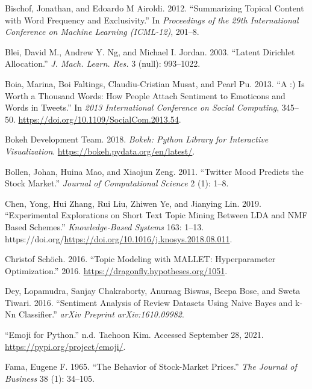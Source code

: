 \documentclass[
]{article}
\newlength{\cslhangindent}
\newlength{\cslentryspacingunit} %
\newenvironment{CSLReferences}[2] %
 {%
  \setlength{\parindent}{0pt}
  \ifodd #1
  \let\oldpar\par
  \def\par{\hangindent=\cslhangindent\oldpar}
  \fi
  \setlength{\parskip}{#2\cslentryspacingunit}
 }%
 {}
\begin{document}
\begin{CSLReferences}{1}{0}
\leavevmode{}%
Bischof, Jonathan, and Edoardo M Airoldi. 2012. {``Summarizing Topical
Content with Word Frequency and Exclusivity.''} In \emph{Proceedings of
the 29th International Conference on Machine Learning (ICML-12)},
201--8.

\leavevmode{}%
Blei, David M., Andrew Y. Ng, and Michael I. Jordan. 2003. {``Latent
Dirichlet Allocation.''} \emph{J. Mach. Learn. Res.} 3 (null):
993--1022.

\leavevmode{}%
Boia, Marina, Boi Faltings, Claudiu-Cristian Musat, and Pearl Pu. 2013.
{``A :) Is Worth a Thousand Words: How People Attach Sentiment to
Emoticons and Words in Tweets.''} In \emph{2013 International Conference
on Social Computing}, 345--50.
\url{https://doi.org/10.1109/SocialCom.2013.54}.

\leavevmode{}%
Bokeh Development Team. 2018. \emph{Bokeh: Python Library for
Interactive Visualization}. \url{https://bokeh.pydata.org/en/latest/}.

\leavevmode{}%
Bollen, Johan, Huina Mao, and Xiaojun Zeng. 2011. {``Twitter Mood
Predicts the Stock Market.''} \emph{Journal of Computational Science} 2
(1): 1--8.

\leavevmode{}%
Chen, Yong, Hui Zhang, Rui Liu, Zhiwen Ye, and Jianying Lin. 2019.
{``Experimental Explorations on Short Text Topic Mining Between LDA and
NMF Based Schemes.''} \emph{Knowledge-Based Systems} 163: 1--13.
https://doi.org/\url{https://doi.org/10.1016/j.knosys.2018.08.011}.

\leavevmode{}%
Christof Schöch. 2016. {``Topic Modeling with MALLET: Hyperparameter
Optimization.''} 2016. \url{https://dragonfly.hypotheses.org/1051}.

\leavevmode{}%
Dey, Lopamudra, Sanjay Chakraborty, Anuraag Biswas, Beepa Bose, and
Sweta Tiwari. 2016. {``Sentiment Analysis of Review Datasets Using Naive
Bayes and k-Nn Classifier.''} \emph{arXiv Preprint arXiv:1610.09982}.

\leavevmode{}%
{``Emoji for Python.''} n.d. Taehoon Kim. Accessed September 28, 2021.
\url{https://pypi.org/project/emoji/}.

\leavevmode{}%
Fama, Eugene F. 1965. {``The Behavior of Stock-Market Prices.''}
\emph{The Journal of Business} 38 (1): 34--105.


\end{CSLReferences}
\end{document}
